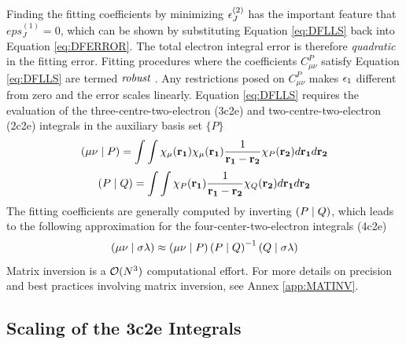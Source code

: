 \noindent Finding the fitting coefficients by minimizing $\epsilon_J^{(2)}$ has the important feature that $eps_J^{(1)} = 0$, which can be shown by substituting Equation \ref{eq:DFLLS} back into Equation \ref{eq:DFERROR}. The total electron integral error is therefore \emph{quadratic} in the fitting error. Fitting procedures where the coefficients $C^P_{\mu\nu}$ satisfy Equation \ref{eq:DFLLS} are termed $\emph{robust}$ \cite{Dun2000}. Any restrictions posed on $C^P_{\mu\nu}$ makes $\epsilon_{1}$ different from zero and the error scales linearly. 
Equation \ref{eq:DFLLS} requires the evaluation of the three-centre-two-electron (3c2e) and two-centre-two-electron (2c2e) integrals in the auxiliary basis set $\{P\}$
\begin{equation}
\left( \mu\nu \mid P \right) = \int \int \chi_{\mu}(\mathbf{r_1}) \chi_{\mu}(\mathbf{r_1}) \frac{1}{\mathbf{r_1} - \mathbf{r_2}} \chi_{P}(\mathbf{r_2}) d\mathbf{r_1} d\mathbf{r_2} 
\end{equation}
\begin{equation}
\left( P \mid Q \right) = \int \int \chi_{P}(\mathbf{r_1}) \frac{1}{\mathbf{r_1} - \mathbf{r_2}} \chi_{Q}(\mathbf{r_2}) d\mathbf{r_1} d\mathbf{r_2} 
\end{equation}
\noindent The fitting coefficients are generally computed by inverting $\left( P \mid Q \right)$, which leads to the following approximation for the four-center-two-electron integrals (4c2e)
\begin{equation}
\left( \mu\nu \mid \sigma\lambda \right) \approx \left( \mu\nu \mid P \right) \left( P \mid Q \right)^{-1} \left( Q \mid \sigma\lambda \right)
\end{equation}
\noindent Matrix inversion is a $\mathcal{O}(N^{3})$ computational effort. For more details on precision and best practices involving matrix inversion, see Annex \ref{app:MATINV}.

\subsection{Scaling of the 3c2e Integrals}

